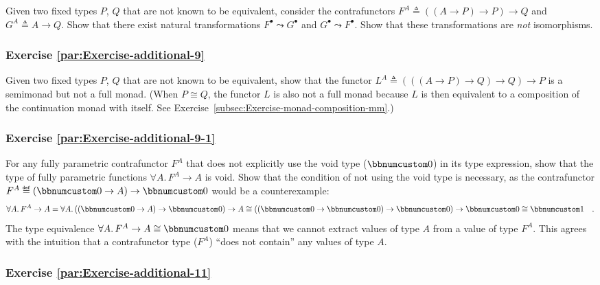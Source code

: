 Given two fixed types $P$, $Q$ that are not known to be equivalent,
consider the contrafunctors $F^{A}\triangleq\left(\left(A\rightarrow P\right)\rightarrow P\right)\rightarrow Q$
and $G^{A}\triangleq A\rightarrow Q$. Show that there exist natural
transformations $F^{\bullet}\leadsto G^{\bullet}$ and $G^{\bullet}\leadsto F^{\bullet}$.
Show that these transformations are \emph{not} isomorphisms.

\subsubsection{Exercise \label{par:Exercise-additional-9}\ref{par:Exercise-additional-9}}

Given two fixed types $P$, $Q$ that are not known to be equivalent,
show that the functor $L^{A}\triangleq\left(\left(\left(A\rightarrow P\right)\rightarrow Q\right)\rightarrow Q\right)\rightarrow P$
is a semimonad but not a full monad. (When $P\cong Q$, the functor
$L$ is also not a full monad because $L$ is then equivalent to a
composition of the continuation monad with itself. See Exercise~\ref{subsec:Exercise-monad-composition-mm}.)

\subsubsection{Exercise \label{par:Exercise-additional-9-1}\ref{par:Exercise-additional-9-1}}

For any fully parametric contrafunctor $F^{A}$ that does not explicitly
use the void type ($\bbnum 0$) in its type expression,
show that the type of fully parametric functions $\forall A.\,F^{A}\rightarrow A$
is void. Show that the condition of not using the void type is necessary,
as the contrafunctor $F^{A}\triangleq(\bbnum 0\rightarrow A)\rightarrow\bbnum 0$
would be a counterexample:
\[
\forall A.\,F^{A}\rightarrow A=\forall A.\,((\bbnum 0\rightarrow A)\rightarrow\bbnum 0)\rightarrow A\cong((\bbnum 0\rightarrow\bbnum 0)\rightarrow\bbnum 0)\rightarrow\bbnum 0\cong\bbnum 1\quad.
\]
The type equivalence $\forall A.\,F^{A}\rightarrow A\cong\bbnum 0$
means that we cannot extract values of type $A$ from a value of type
$F^{A}$. This agrees with the intuition that a contrafunctor type
($F^{A}$) \textsf{``}does not contain\textsf{''} any values of type $A$.

\subsubsection{Exercise \label{par:Exercise-additional-11}\ref{par:Exercise-additional-11}}

